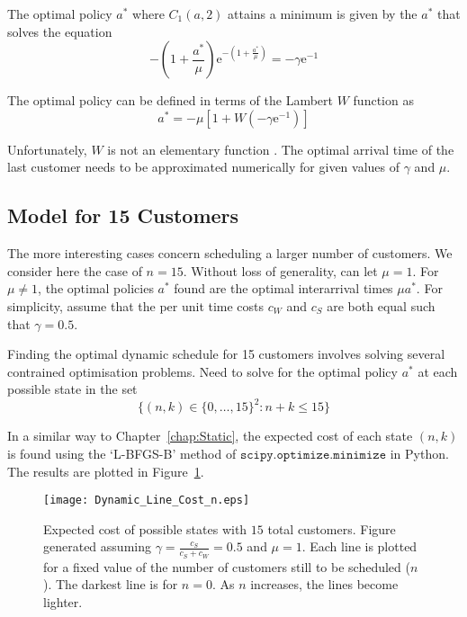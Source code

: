 The optimal policy $a^{*}$ where $C_{1} (a, 2)$ attains a minimum is given by the $a^{*}$ that solves the equation
\begin{equation}
	- \left( 1 + \frac{a^{*}}{\mu} \right) \mathrm{e}^{- \left( 1 + \frac{a^{*}}{\mu} \right)} = - \gamma \mathrm{e}^{-1}
\end{equation}

The optimal policy can be defined in terms of the Lambert $W$ function as
\begin{equation}
	a^{*} = - \mu \left[ 1 + W \left( - \gamma \mathrm{e}^{-1} \right) \right]
\end{equation}

Unfortunately, $W$ is not an elementary function \citep{Chow}. The optimal arrival time of the last customer needs to be approximated numerically for given values of $\gamma$ and $\mu$.

\subsection{Model for 15 Customers}
The more interesting cases concern scheduling a larger number of customers. We consider here the case of $n = 15$. Without loss of generality, can let $\mu = 1$. For $\mu \neq 1$, the optimal policies $a^{*}$ found are the optimal interarrival times $\mu a^{*}$. For simplicity, assume that the per unit time costs $c_{W}$ and $c_{S}$ are both equal such that $\gamma = 0.5$.

Finding the optimal dynamic schedule for 15 customers involves solving several contrained optimisation problems. Need to solve for the optimal policy $a^{*}$ at each possible state in the set
\begin{equation}
	\Big\{ (n, k) \in \{ 0, \ldots, 15 \}^{2} : n + k \leq 15 \Big\}
\end{equation}

In a similar way to Chapter~\ref{chap:Static}, the expected cost of each state $(n, k)$ is found using the `L-BFGS-B' method of $\texttt{scipy.optimize.minimize}$ in Python. The results are plotted in Figure~\ref{fig:Dynamic_Cost_15}.
\begin{figure}[htb]
	\centering
	\texttt{[image: Dynamic\_Line\_Cost\_n.eps]}
	\caption{Expected cost of possible states with $15$ total customers. Figure generated assuming $\gamma = \frac{c_{S}}{c_{S} + c_{W}} = 0.5$ and $\mu = 1$. Each line is plotted for a fixed value of the number of customers still to be scheduled ($n$). The darkest line is for $n = 0$. As $n$ increases, the lines become lighter.}
	\label{fig:Dynamic_Cost_15}
\end{figure}

